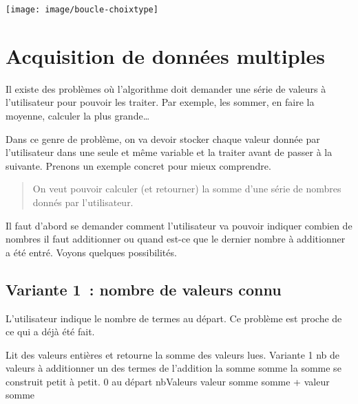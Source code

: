 	\begin{center}
		\bigskip
		\texttt{[image: image/boucle-choixtype]}
				\label{fig:boucle-choix}
	\end{center}

	
\section{Acquisition de données multiples}

	Il existe des problèmes
	où l’algorithme doit demander une série de valeurs
	à l’utilisateur pour pouvoir les traiter.
	Par exemple, les sommer, en faire la moyenne,
	calculer la plus grande\dots
	
	Dans ce genre de problème,
	on va devoir stocker chaque valeur donnée par l’utilisateur 
	dans une seule et même variable et la traiter avant de passer
	à la suivante.
	Prenons un exemple concret pour mieux comprendre.

	\begin{quote}
	On veut pouvoir calculer (et retourner)
	la somme d’une série de nombres donnés par l’utilisateur. 
	\end{quote}

	Il faut d’abord se demander 
	comment l’utilisateur va pouvoir indiquer
	combien de nombres il faut additionner 
	ou quand est-ce que le dernier nombre à additionner a été entré. 
	Voyons quelques possibilités.
	
	\clearpage
	\subsection{Variante 1~: nombre de valeurs connu} 
	
		L’utilisateur indique le nombre de termes au départ.
		Ce problème est proche de ce qui a déjà été fait.
		
		\begin{LDA}
		\LComment Lit des valeurs entières et retourne la somme des valeurs lues.
		 \RComment Variante 1
			 \RComment nb de valeurs à additionner
			 \RComment un des termes de l’addition
			 \RComment la somme
			\Let somme  \RComment la somme se construit petit à petit. 0 au départ
			\Read nbValeurs
				\Read valeur
				\Let somme \Gets somme + valeur 
			\EndFor
			\Return somme
		\EndAlgo
		\end{LDA}

